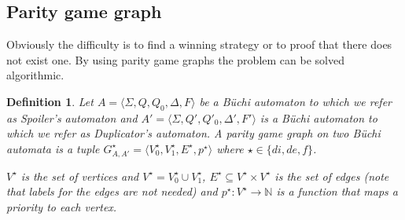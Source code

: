\documentclass[12pt,oneside,bibliography=totoc,abstracton]{scrartcl}
\newtheorem{mydef}{Definition}
\begin{document}
\subsection{Parity game graph}
Obviously the difficulty is to find a winning strategy or to proof that there does not exist one.
By using parity game graphs the problem can be solved algorithmic.
\begin{mydef}\label{def_paritygamegraph}
	Let $A = \langle\Sigma, Q , Q_0, \Delta, F\rangle$ be a Büchi automaton to which we refer
	as Spoiler's automaton and $A' = \langle\Sigma, Q' , Q'_0, \Delta', F'\rangle$ is a Büchi automaton
	to which we refer as Duplicator's automaton.
	A \textnormal{parity game graph} on two Büchi automata is a tuple
	$G^{\star}_{A, A'} = \langle V_0^{\star}, V_1^{\star}, E^{\star}, p^{\star}\rangle$
	where $\star \in \{di, de, f\}$.
	
	$V^{\star}$ is the set of vertices and $V^{\star} = V_0^{\star} \cup V_1^{\star}$, $E^{\star} \subseteq V^{\star} \times V^{\star}$
	is the set of edges (note that labels for the edges are not needed) and $p^{\star}: V^{\star} \to \mathbb{N}$ is
	a function that maps a priority to each vertex.
	

\end{mydef}
\end{document}
